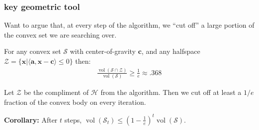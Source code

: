 \documentclass[compress]{beamer}
\newcommand{\bv}[1]{\mathbf{#1}}
\DeclareMathOperator{\vol}{vol}
\begin{document}
\begin{frame}[t]
	\frametitle{key geometric tool}
	Want to argue that, at every step of the algorithm, we ``cut off'' a large portion of the convex set we are searching over.
	
	\begin{theorem}
		For any convex set $\mathcal{S}$ with center-of-gravity $\bv{c}$, and any halfspace 	$\mathcal{Z} = \{\bv{x} \big\vert \langle \bv{a}, \bv{x}-\bv{c}\rangle \leq 0\}$ then:
		\begin{align*}
			\frac{\vol(\mathcal{S} \cap \mathcal{Z})}{\vol(\mathcal{S})}\geq \frac{1}{e} \approx .368
		\end{align*}
	\end{theorem}
	
	Let $\mathcal{Z}$ be the compliment of $\mathcal{H}$ from the algorithm. Then we cut off at least a $1/e$ fraction of the convex body on every iteration.  
	
	\textbf{Corollary:} After $t$ steps, $\vol(\mathcal{S}_t) \leq \left(1-\frac{1}{e}\right)^t\vol(\mathcal{S})$.
\end{frame}
\end{document}
